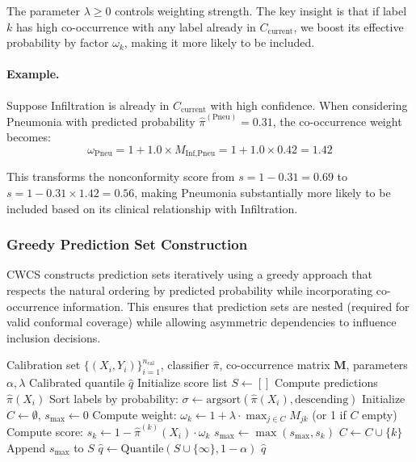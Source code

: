 The parameter $\lambda \geq 0$ controls weighting strength. The key insight is that if label $k$ has high co-occurrence with any label already in $C_{\text{current}}$, we boost its effective probability by factor $\omega_k$, making it more likely to be included.

\paragraph{Example.} Suppose Infiltration is already in $C_{\text{current}}$ with high confidence. When considering Pneumonia with predicted probability $\hat{\pi}^{(\text{Pneu})} = 0.31$, the co-occurrence weight becomes:
\begin{equation}
\omega_{\text{Pneu}} = 1 + 1.0 \times M_{\text{Inf,Pneu}} = 1 + 1.0 \times 0.42 = 1.42
\end{equation}

This transforms the nonconformity score from $s = 1 - 0.31 = 0.69$ to $s = 1 - 0.31 \times 1.42 = 0.56$, making Pneumonia substantially more likely to be included based on its clinical relationship with Infiltration.

\subsubsection{Greedy Prediction Set Construction}

CWCS constructs prediction sets iteratively using a greedy approach that respects the natural ordering by predicted probability while incorporating co-occurrence information. This ensures that prediction sets are nested (required for valid conformal coverage) while allowing asymmetric dependencies to influence inclusion decisions.

\begin{algorithm*}[htbp]
\caption{CWCS Calibration}
\begin{algorithmic}[1]
\Require Calibration set $\{(X_i, Y_i)\}_{i=1}^{n_{\text{cal}}}$, classifier $\hat{\pi}$, co-occurrence matrix $\mathbf{M}$, parameters $\alpha, \lambda$
\Ensure Calibrated quantile $\hat{q}$
\State Initialize score list $S \leftarrow []$
    \State Compute predictions $\hat{\pi}(X_i)$
    \State Sort labels by probability: $\sigma \leftarrow \text{argsort}(\hat{\pi}(X_i), \text{descending})$
    \State Initialize $C \leftarrow \emptyset$, $s_{\max} \leftarrow 0$
        \State Compute weight: $\omega_k \leftarrow 1 + \lambda \cdot \max_{j \in C} M_{jk}$ (or 1 if $C$ empty)
        \State Compute score: $s_k \leftarrow 1 - \hat{\pi}^{(k)}(X_i) \cdot \omega_k$
            \State $s_{\max} \leftarrow \max(s_{\max}, s_k)$
        \EndIf
        \State $C \leftarrow C \cup \{k\}$
    \EndFor
    \State Append $s_{\max}$ to $S$
\EndFor
\State $\hat{q} \leftarrow \text{Quantile}(S \cup \{\infty\}, 1-\alpha)$
\State \Return $\hat{q}$
\end{algorithmic}
\end{algorithm*}

